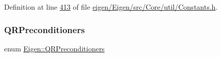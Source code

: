 Definition at line \hyperlink{eigen_2_eigen_2src_2_core_2util_2_constants_8h_source_l00413}{413} of file \hyperlink{eigen_2_eigen_2src_2_core_2util_2_constants_8h_source}{eigen/\+Eigen/src/\+Core/util/\+Constants.\+h}.

\mbox{\label{group__enums_ga46eba0d5c621f590b8cf1b53af31d56e}} 
\subsubsection{\texorpdfstring{Q\+R\+Preconditioners}{QRPreconditioners}\hspace{0.1cm}{\footnotesize\ttfamily [2/2]}}
{\footnotesize\ttfamily enum \hyperlink{group__enums_ga46eba0d5c621f590b8cf1b53af31d56e}{Eigen\+::\+Q\+R\+Preconditioners}}

